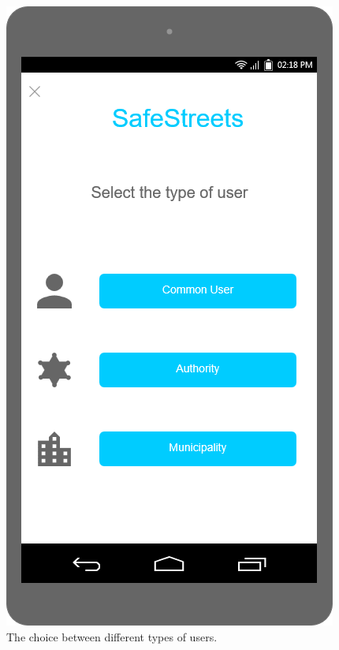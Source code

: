 \documentclass[./main.tex]{subfiles}
\begin{document}
\clearpage

\begin{figure}
    \centering
    \begin{minipage}[t]{\mockupdimension}
        \includegraphics[width=\textwidth]{resources/Mockups/select_user}
        \caption{The choice between different types of users.}
        \label{fig:select_user}

\end{minipage}
\end{figure}
\end{document}
